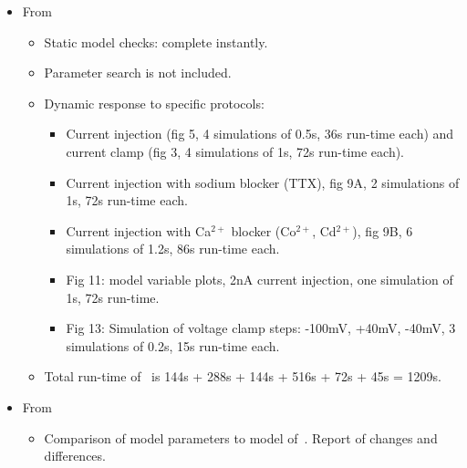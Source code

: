 \documentclass[12pt]{article}
\begin{document}
\begin{itemize}
\item From~\cite{De-Schutter-E:1994vn}

  \begin{itemize}
  \item Static model checks: complete instantly.
  \item Parameter search is not included.
  \item Dynamic response to specific protocols:
    \begin{itemize}
    \item Current injection (fig 5, 4 simulations of 0.5s, 36s
      run-time each) and current clamp (fig 3, 4 simulations of 1s,
      72s run-time each).
    \item Current injection with sodium blocker (TTX), fig 9A, 2
      simulations of 1s, 72s run-time each.
    \item Current injection with Ca$^{2+}$ blocker (Co$^{2+}$,
      Cd$^{2+}$), fig 9B, 6 simulations of 1.2s, 86s run-time each.
    \item Fig 11: model variable plots, 2nA current injection, one
      simulation of 1s, 72s run-time.
    \item Fig 13: Simulation of voltage clamp steps: -100mV, +40mV,
      -40mV, 3 simulations of 0.2s, 15s run-time each.
    \end{itemize}

  \item Total run-time of~\cite{De-Schutter-E:1994vn} is 144s + 288s +
    144s + 516s + 72s + 45s = 1209s.
  \end{itemize}


\item From~\cite{E:1994hc}

  \begin{itemize}
  \item Comparison of model parameters to model
    of~\cite{De-Schutter-E:1994vn}.  Report of changes and
    differences.


\end{itemize}
\end{itemize}
\end{document}
